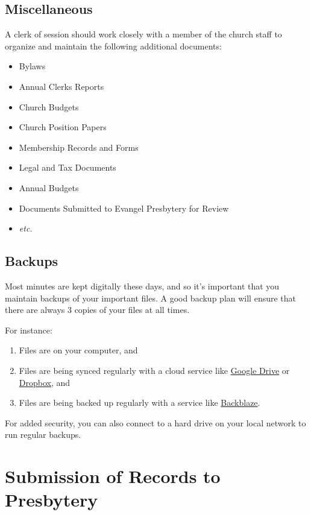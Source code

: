 \documentclass[
]{book}
\providecommand{\tightlist}{%
  \setlength{\itemsep}{0pt}\setlength{\parskip}{0pt}}
\begin{document}
\hypertarget{miscellaneous}{%
\section{Miscellaneous}\label{miscellaneous}}

A clerk of session should work closely with a member of the church staff to organize and maintain the following additional documents:

\begin{itemize}
\tightlist
\item
  Bylaws
\item
  Annual Clerks Reports
\item
  Church Budgets
\item
  Church Position Papers
\item
  Membership Records and Forms
\item
  Legal and Tax Documents
\item
  Annual Budgets
\item
  Documents Submitted to Evangel Presbytery for Review
\item
  \emph{etc.}
\end{itemize}

\hypertarget{backups}{%
\section{Backups}\label{backups}}

Most minutes are kept digitally these days, and so it's important that you maintain backups of your important files. A good backup plan will ensure that there are always 3 copies of your files at all times.

For instance:

\begin{enumerate}
\def\labelenumi{\arabic{enumi}.}
\tightlist
\item
  Files are on your computer, and
\item
  Files are being synced regularly with a cloud service like \href{https://drive.google.com}{Google Drive} or \href{https://dropbox.com}{Dropbox}, and
\item
  Files are being backed up regularly with a service like \href{https://www.backblaze.com}{Backblaze}.
\end{enumerate}

For added security, you can also connect to a hard drive on your local network to run regular backups.

\hypertarget{submission-of-records-to-presbytery}{%
\chapter{Submission of Records to Presbytery}\label{submission-of-records-to-presbytery}}
\end{document}
